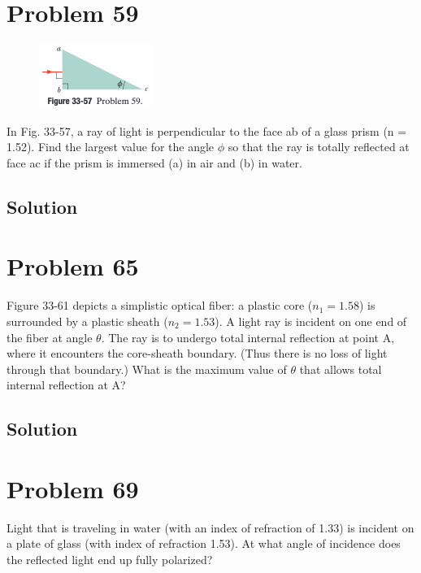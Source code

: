 \documentclass[12pt]{article}
\begin{document}
    \pagebreak
    \section{Problem 59}
        \begin{figure}
            \vspace{-30pt}
            \includegraphics[width=0.33\textwidth]{33-57.png} 
        \end{figure}
        In Fig. 33-57, a ray of light is perpendicular to the face ab of a glass prism (n = 1.52).
        Find the largest value for the angle $\phi$ so that the ray is totally reflected at face ac if the prism is immersed (a) in air and (b) in water.

        \subsection{Solution}

    \pagebreak
    \section{Problem 65}
        Figure 33-61 depicts a simplistic optical fiber: a plastic core ($n_1 = 1.58$) is surrounded by a plastic sheath ($n_2 = 1.53$). 
        A light ray is incident on one end of the fiber at angle $\theta$. 
        The ray is to undergo total internal reflection at point A, where it encounters the core-sheath boundary. 
        (Thus there is no loss of light through that boundary.) 
        What is the maximum value of $\theta$ that allows total internal reflection at A?

        \subsection{Solution}

    \pagebreak
    \section{Problem 69}
        Light that is traveling in water (with an index of refraction of 1.33) is incident on a plate of glass (with index of refraction 1.53). 
        At what angle of incidence does the reflected light end up fully polarized?
\end{document}
